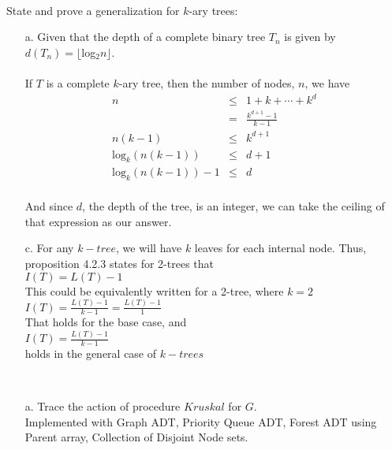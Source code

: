 \documentclass[letterpaper,10pt]{article}
\begin{document}
\begin{flushleft}
\begin{itemize}
\end{itemize}
~\\

 State and prove a generalization for $k$-ary trees: 
~\\
 \begin{itemize}
\item[a.]Given that the depth of a complete binary tree $T_n$ is given by\\
$d(T_n)=\lfloor$log$_2n \rfloor$. \\
~\\
If $T$ is a complete $k$-ary tree, then the number of nodes, $n$, we have \\ 
\begin{eqnarray*}
n &\leq& 1 + k + \cdots + k^d\\
&=& \frac{k^{d+1}-1}{k-1}\\
n(k-1) &\leq& k^{d+1}\\
\text{log}_k(n(k-1)) &\leq& d+1 \\
\text{log}_k(n(k-1))-1 &\leq& d \\
\end{eqnarray*}

And since $d$, the depth of the tree, is an integer, we can take the ceiling of that expression as our answer.

\item[c.] For any $k-tree$, we will have $k$ leaves for each internal node.  Thus, proposition 4.2.3 states for 2-trees that\\
$I(T)=L(T)-1$\\
This could be equivalently written for a 2-tree, where $k=2$\\
$I(T)=\frac{L(T)-1}{k-1}=\frac{L(T)-1}{1}$ \\
That holds for the base case, and\\
$I(T)=\frac{L(T)-1}{k-1}$ \\
holds in the general case of $k-trees$
\end{itemize}

\newpage
  ~~
 \begin{itemize}
\item[a.] Trace the action of procedure $Kruskal$ for $G$. \\
Implemented with Graph ADT, Priority Queue ADT, Forest ADT using Parent array, Collection of Disjoint Node sets. \\
~\\


\end{itemize}
\end{flushleft}
\end{document}
